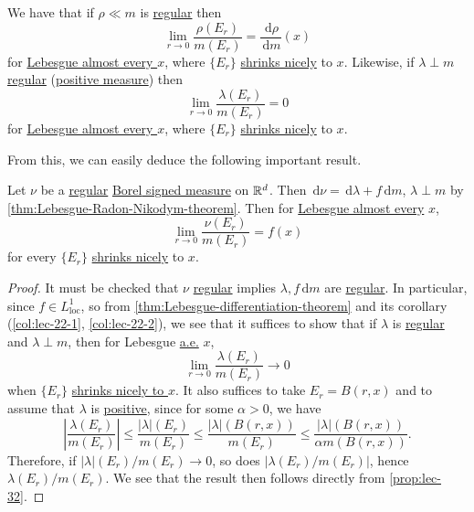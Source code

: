 \begin{prev}
	We have that if \(\rho \ll m\) is \hyperref[def:regular]{regular} then
	\[
		\lim_{r \to 0} \frac{\rho(E_r)}{m(E_r)} = \frac{\,\mathrm{d}\rho}{\,\mathrm{d}m}(x)
	\]
	for \hyperref[def:mu-almost-everywhere]{Lebesgue almost every \(x\)}, where \(\{E_r\}\) \hyperref[def:shrink-nicely]{shrinks nicely} to \(x\).
	Likewise, if \(\lambda \perp m\) \hyperref[def:regular]{regular} (\hyperref[def:signed-measure]{positive measure}) then
	\[
		\lim_{r \to 0} \frac{\lambda(E_r)}{m(E_r)} = 0
	\]
	for \hyperref[def:mu-almost-everywhere]{Lebesgue almost every \(x\)}, where \(\{E_r\}\) \hyperref[def:shrink-nicely]{shrinks nicely} to \(x\).
\end{prev}

From this, we can easily deduce the following important result.
\begin{theorem}\label{thm:Lebesgue-differentiation-theorem-for-regular-measure}
	Let \(\nu\) be a \hyperref[def:regular]{regular}  \hyperref[def:signed-measure]{\hyperref[def:Borel-measure]{Borel} signed measure} on \(\mathbb{\MakeUppercase{r}} ^d\).
	Then \(\,\mathrm{d}\nu = \,\mathrm{d}\lambda + f \,\mathrm{d}m\), \(\lambda \perp m\) by \autoref{thm:Lebesgue-Radon-Nikodym-theorem}.
	Then for \hyperref[def:mu-almost-everywhere]{Lebesgue almost every} \(x\),
	\[
		\lim_{r \to 0} \frac{\nu(E_r)}{m(E_r)} = f(x)
	\]
	for every \(\{E_r\}\) \hyperref[def:shrink-nicely]{shrinks nicely} to \(x\).
\end{theorem}
\begin{proof}
	It must be checked that \(\nu\) \hyperref[def:regular]{regular} implies \(\lambda, f \,\mathrm{d}m\) are \hyperref[def:regular]{regular}.
	In particular, since \(f\in L^1_{\mathrm{loc} } \), so from \autoref{thm:Lebesgue-differentiation-theorem} and its corollary (\autoref{col:lec-22-1}, \autoref{col:lec-22-2}),
	we see that it suffices to show that if \(\lambda \) is \hyperref[def:regular]{regular} and \(\lambda \perp m\),
	then for Lebesgue \hyperref[def:mu-almost-everywhere]{a.e.} \(x\),
	\[
		\lim\limits_{r \to 0} \frac{\lambda (E_{r} )}{m(E_{r} )}\to 0
	\]
	when \(\{E_{r} \}\) \hyperref[def:shrink-nicely]{shrinks nicely to \(x\)}. It also suffices to take \(E_{r} = B(r, x)\) and to assume that \(\lambda \) is
	\hyperref[def:signed-measure]{positive}, since for some \(\alpha >0\), we have
	\[
		\left\vert \frac{\lambda (E_{r} )}{m(E_{r} )} \right\vert
		\leq \frac{\left\vert \lambda \right\vert(E_{r} ) }{m(E_{r} )}
		\leq \frac{\left\vert \lambda \right\vert(B(r, x)) }{m(E_{r} )}
		\leq \frac{\left\vert \lambda \right\vert(B(r, x)) }{\alpha m(B(r, x))}.
	\]
	Therefore, if \(\left\vert \lambda \right\vert(E_{r} ) / m(E_{r} ) \to 0\), so does \(\left\vert \lambda (E_{r} ) / m(E_{r} ) \right\vert \),
	hence \(\lambda (E_{r} ) / m(E_{r} )\). We see that the result then follows directly from \autoref{prop:lec-32}.
\end{proof}

